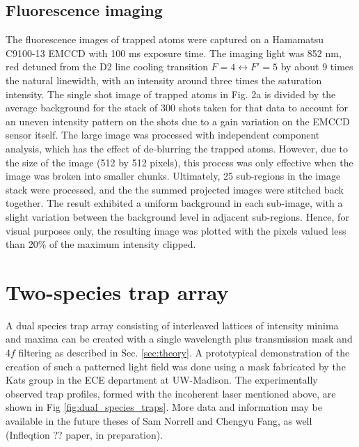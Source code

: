 \subsection{Fluorescence imaging}\label{sub:imaging}
The fluorescence images of trapped atoms were captured on a  Hamamatsu C9100-13 EMCCD with 100 ms exposure time. The imaging light was 852 nm, red detuned from the D2 line cooling transition $F=4 \leftrightarrow F'=5$ by about 9 times the natural linewidth, with an intensity around three times the saturation intensity. The single shot image of trapped atoms in Fig. 2a is divided by the average background for the stack of 300 shots taken for that data to account for an uneven intensity pattern on the shots due to a gain variation on the EMCCD sensor itself. The large image was processed with independent component analysis, which has the effect of de-blurring the trapped atoms. However, due to the size of the image (512 by 512 pixels), this process was only effective when the image was broken into smaller chunks. Ultimately, 25 sub-regions in the image stack were processed, and the the summed projected images were stitched back together. The result exhibited a uniform background in each sub-image, with a slight variation between the background level in adjacent sub-regions. Hence, for visual purposes only, the resulting image was plotted with the pixels valued less than 20$\%$ of the maximum intensity clipped.

\section{Two-species trap array}


A dual species trap array consisting of interleaved lattices of intensity minima and maxima can be created with a single wavelength plus transmission mask and 4$f$ filtering as described in Sec. \ref{sec:theory}. A prototypical demonstration of the creation of such a patterned light field was done using a mask fabricated by the Kats group in the ECE department at UW-Madison. The experimentally observed trap profiles, formed with the incoherent laser mentioned above, are shown in Fig \ref{fig:dual_species_traps}. More data and information may be available in the future theses of Sam Norrell and Chengyu Fang, as well (Infleqtion ?? paper, in preparation).

